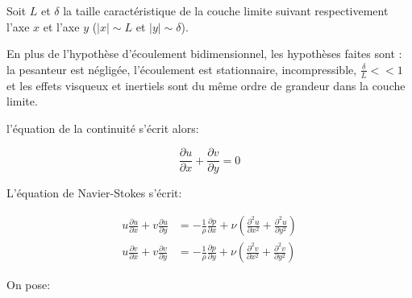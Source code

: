 \documentclass[french]{article}
\begin{document}
Soit $L$ et $\delta$ la taille caractéristique de la couche limite suivant respectivement l'axe $x$ et l'axe $y$ ($\left| x \right| \sim L$ et $\left| y \right| \sim \delta$).

En plus de l'hypothèse d'écoulement bidimensionnel, les hypothèses faites sont : la pesanteur est négligée, l'écoulement est stationnaire, incompressible, $\frac{\delta}{L} << 1$ et les effets visqueux et inertiels sont du même ordre de grandeur dans la couche limite.



l'équation de la continuité s'écrit alors:

\begin{equation}
\label{Eq:1}
\frac{\partial u}{\partial x} + \frac{\partial v}{\partial y} = 0
\end{equation}


L'équation de Navier-Stokes s'écrit:

\begin{align}%
	u\frac{\partial u}{\partial x} + 
	v\frac{\partial u}{\partial y} 
	&= - \frac{1}{\rho}
	\frac{\partial p}{\partial  x} +
	\nu\left (
	\frac{\partial^{2} u}{\partial  x^{2}} + 
	\frac{\partial^{2} u}{\partial  y^{2}}
	\right ) \\
	u\frac{\partial v}{\partial x} + 
	v\frac{\partial v}{\partial y} 
	&= - \frac{1}{\rho}
	\frac{\partial p}{\partial  y} +
	\nu\left (
	\frac{\partial^{2} v}{\partial  x^{2}} + 
	\frac{\partial^{2} v}{\partial  y^{2}}
	\right ) 
\end{align}

On pose:
\end{document}
